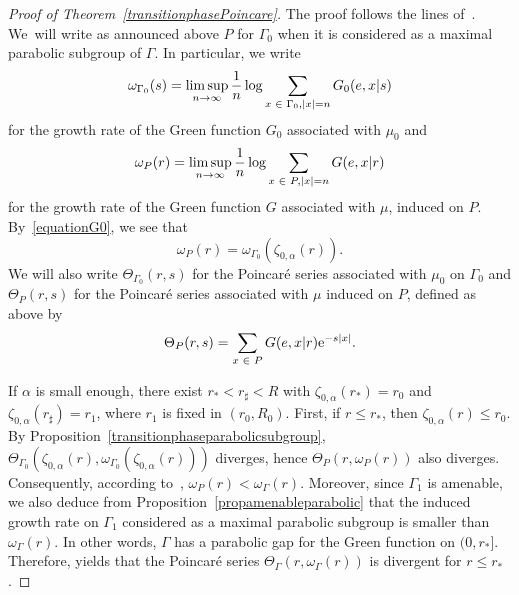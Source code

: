 \documentclass[10pt]{amsart}
\theoremstyle{definition}\newtheorem{defi}[theo]{Definition}\newtheorem{rema}[theo]{Remark}\newtheorem{exam}[theo]{Example}\newtheorem{exem}[theo]{Example}\newtheorem{nota}[theo]{Notation}
\newcommand{\rme}{\mathrm{e}}
\let\oldin\in
\renewcommand{\in}{\mathchoice{\oldin}{\oldin}{\,\oldin\,}{\,\oldin\,}}
\renewcommand*{\to}{\mathchoice{\longrightarrow}{\rightarrow}{\rightarrow}{\rightarrow}}
\begin{document}
\begin{proof}[{Proof of Theorem~\ref{transitionphasePoincare}}]
The proof follows the lines of~\cite[Example~C]{DWY}. We~will write as announced above $P$ for $\Gamma_0$ when it is considered as a maximal parabolic subgroup of $\Gamma$. In particular, we write
\[
\omega_{\Gamma_0}(s)=\limsup_{n\to\infty} \frac{1}{n}\log \sum_{x\in \Gamma_0,|x|=n}G_0(e,x|s)
\]
for the growth rate of the Green function $G_0$ associated with $\mu_0$ and
\[
\omega_P(r)=\limsup_{n\to\infty} \frac{1}{n}\log \sum_{x\in P,|x|=n}G(e,x|r)
\]
for the growth rate of the Green function $G$ associated with $\mu$, induced on $P$. By~\eqref{equationG0}, we see that
\begin{equation}\label{equationgrowthrates}
\omega_P(r)=\omega_{\Gamma_0}(\zeta_{0,\alpha}(r)).
\end{equation}
We will also write $\Theta_{\Gamma_0}(r,s)$ for the Poincaré series associated with $\mu_0$ on $\Gamma_0$ and $\Theta_P(r,s)$ for the Poincaré series associated with $\mu$ induced on $P$, defined as above by
\[
\Theta_P(r,s)=\sum_{x\in P}G(e,x|r)\rme^{-s|x|}.
\]

If $\alpha$ is small enough, there exist $r_*<r_\sharp <R$ with $\zeta_{0,\alpha}(r_*)=r_0$ and $\zeta_{0,\alpha}(r_\sharp)=r_1$, where $r_1$ is fixed in $(r_0,R_0)$. First, if $r\leq r_*$, then $\zeta_{0,\alpha}(r)\leq r_0$. By Proposition~\ref{transitionphaseparabolicsubgroup}, $\Theta_{\Gamma_0}(\zeta_{0,\alpha}(r),\omega_{\Gamma_0}(\zeta_{0,\alpha}(r)))$ diverges, hence $\Theta_P(r,\omega_{P}(r))$ also diverges. Consequently, according to~\cite[Corollary~3.9]{DWY}, $\omega_P(r)<\omega_\Gamma(r)$. Moreover, since $\Gamma_1$ is amenable, we also deduce from Proposition~\ref{propamenableparabolic} that the induced growth rate on $\Gamma_1$ considered as a maximal parabolic subgroup is smaller than $\omega_\Gamma(r)$. In other words, $\Gamma$ has a parabolic gap for the Green function on $(0,r_*]$. Therefore, \cite[Lemma~3.7]{DWY} yields that the Poincaré series $\Theta_{\Gamma}(r,\omega_\Gamma(r))$ is divergent for $r\leq r_*$.


\end{proof}
\end{document}
